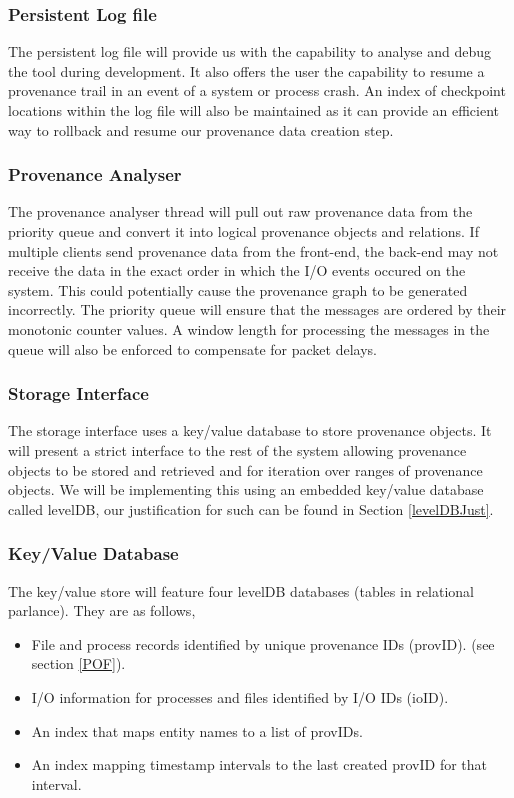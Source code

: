 \subsubsection{Persistent Log file}
The persistent log file will provide us with the capability to analyse and debug the tool during development. It also offers the user the capability to resume a provenance trail in an event of a system or process crash. An index of checkpoint locations within the log file will also be maintained as it can provide an efficient way to rollback and resume our provenance data creation step.

\subsubsection{Provenance Analyser}
The provenance analyser thread will pull out raw provenance data from the priority queue and convert it into logical provenance objects and relations. If multiple clients send provenance data from the front-end, the back-end may not receive the data in the exact order in which the I/O events occured on the system. This could potentially cause the provenance graph to be generated incorrectly. The priority queue will ensure that the messages are ordered by their monotonic counter values. A window length for processing the messages in the queue will also be enforced to compensate for packet delays.

\subsubsection{Storage Interface}
The storage interface uses a key/value database to store provenance objects. It will present a strict interface to the rest of the system allowing provenance objects to be stored and retrieved and for iteration over ranges of provenance objects. We will be implementing this using an embedded key/value database called levelDB, our justification for such can be found in Section \ref{levelDBJust}. 

\subsubsection{Key/Value Database}
The key/value store will feature four levelDB databases (tables in relational parlance). They are as follows,
\begin{itemize}
\item File and process records identified by unique provenance IDs (provID). (see section \ref{POF}).
\item I/O information for processes and files identified by I/O IDs (ioID).
\item An index that maps entity names to a list of provIDs.
\item An index mapping timestamp intervals to the last created provID for that interval.
\end{itemize}

